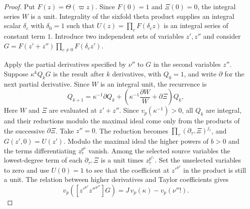 \begin{proof}
Put $F(z)=\Theta(\varpi z)$. Since $F(0)=1$ and $\Xi(0)=0$, the integral series $W$ is a unit. Integrality of the sixfold theta product supplies an integral scalar $\delta_c$ with $\delta_0=1$ such that $U(z)=\prod_c F(\delta_c z)$ is an integral series of constant term $1$. Introduce two independent sets of variables $z',z''$ and consider $G=F(z'+z'')\prod_{c\ne0}F(\delta_c z')$.

Apply the partial derivatives specified by $\nu''$ to $G$ in the second variables $z''$. Suppose $\kappa^kQ_kG$ is the result after $k$ derivatives, with $Q_0=1$, and write $\partial$ for the next partial derivative. Since $W$ is an integral unit, the recurrence is
\[
 Q_{k+1}=\kappa^{-1}\partial Q_k+
    \left(\kappa^{-1}\frac{\partial W}{W}+\partial\Xi\right)Q_k ,
\]
Here $W$ and $\Xi$ are evaluated at $z'+z''$. Since $v_p(\kappa^{-1})>0$, all $Q_k$ are integral, and their reductions modulo the maximal ideal come only from the products of the successive $\partial\Xi$. Take $z''=0$. The reduction becomes $\prod_\tau(\partial_{\tau^+}\Xi)^{j_\tau}$, and $G(z',0)=U(z')$. Modulo the maximal ideal the higher powers of $b>0$ and the terms differentiating $z_\tau^{p^a}$ vanish. Among the selected source variables the lowest-degree term of each $\partial_{\tau^+}\Xi$ is a unit times $z_\tau^{p^{e_\tau}}$. Set the unselected variables to zero and use $U(0)=1$ to see that the coefficient at $z'^{\nu'}$ in the product is still a unit. The relation between higher derivatives and Taylor coefficients gives
\[
 v_p([z'^{\nu'}z''^{\nu''}]G)=J\,v_p(\kappa)-v_p(\nu''!).
\]


\end{proof}
